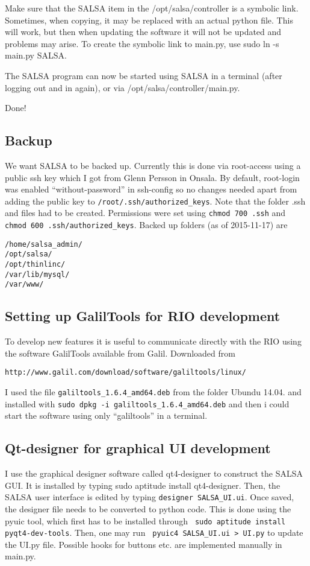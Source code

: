 Make sure that the SALSA item in the /opt/salsa/controller is a symbolic link.
Sometimes, when copying, it may be replaced with an actual python file. This
will work, but then when updating the software it will not be updated and
problems may arise. To create the symbolic link to main.py, use sudo ln -s
main.py SALSA.

The SALSA program can now be started using SALSA in a terminal (after logging
out and in again), or via /opt/salsa/controller/main.py.

Done!

\subsection{Backup}
We want SALSA to be backed up. Currently this is done via root-access using a
public ssh key which I got from Glenn Persson in Onsala. By default, root-login
was enabled “without-password” in ssh-config so no changes needed apart from
adding the public key to \verb!/root/.ssh/authorized_keys!. Note that the folder .ssh
and files had to be created. Permissions were set using \verb!chmod 700 .ssh! and
\verb!chmod 600 .ssh/authorized_keys!. Backed up folders (as of 2015-11-17) are
\begin{verbatim}
/home/salsa_admin/ 
/opt/salsa/ 
/opt/thinlinc/ 
/var/lib/mysql/
/var/www/
\end{verbatim}

\subsection{Setting up GalilTools for RIO development}
To develop new features it is useful to communicate directly with the RIO using
the software GalilTools available from Galil. Downloaded from
\begin{verbatim}
http://www.galil.com/download/software/galiltools/linux/
\end{verbatim} 
I used the file
\verb!galiltools_1.6.4_amd64.deb! from the folder Ubundu 14.04.  and installed
with \verb!sudo dpkg -i galiltools_1.6.4_amd64.deb! and then i could start the
software using only “galiltools” in a terminal.

\subsection{Qt-designer for graphical UI development}
I use the graphical designer software called qt4-designer to construct the
SALSA GUI. It is installed by typing sudo aptitude install qt4-designer.
Then, the SALSA user interface is edited by typing \verb!designer SALSA_UI.ui!.
Once saved, the designer file needs to be converted to python code. This
is done using the pyuic tool, which first has to be installed through
\verb! sudo aptitude install pyqt4-dev-tools!. Then, one may run
\verb! pyuic4 SALSA_UI.ui > UI.py! to update the UI.py file. Possible hooks
for buttons etc. are implemented manually in main.py.
